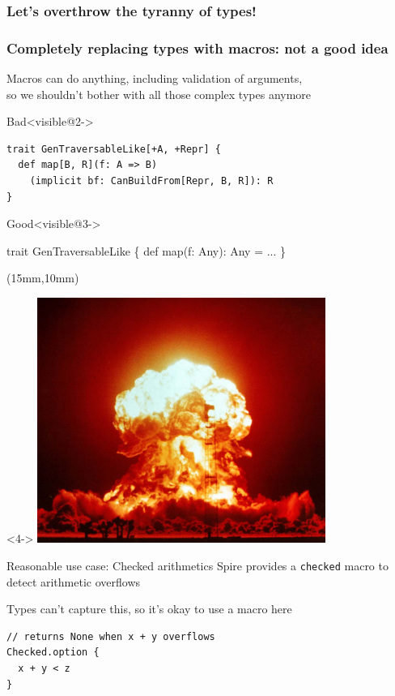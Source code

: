 \documentclass{beamer}
\begin{document}
\begin{frame}[fragile]
  \frametitle<1-3>{Let's overthrow the tyranny of types!}
  \frametitle<4>{Completely replacing types with macros: not a good idea}
  Macros can do anything, including validation of arguments,\\
  so we shouldn't bother with all those complex types anymore

  \vspace{1em}
  \begin{alertblock}{Bad}<visible@2->
    \begin{verbatim}
trait GenTraversableLike[+A, +Repr] {
  def map[B, R](f: A => B)
    (implicit bf: CanBuildFrom[Repr, B, R]): R
}
    \end{verbatim}
  \end{alertblock}
  \vskip-1cm

  \begin{exampleblock}{Good}<visible@3->
    \begin{semiverbatim}
trait GenTraversableLike \{
  def map(f: Any): Any = \text{\color{blue}{macro}} ...
\}
    \end{semiverbatim}
  \end{exampleblock}

  \begin{textblock*}{\textwidth}(15mm,10mm)
    \begin{visibleenv}<4->
      \includegraphics[height=8cm]{img/boom.jpg}
    \end{visibleenv}
  \end{textblock*}
\end{frame}

\begin{frame}[fragile]{Reasonable use case: Checked arithmetics}
  Spire provides a \texttt{checked} macro to detect arithmetic overflows

  Types can't capture this, so it's okay to use a macro here

  \vspace{1em}
  \begin{verbatim}
// returns None when x + y overflows
Checked.option {
  x + y < z
}
  \end{verbatim}
\end{frame}
\end{document}
